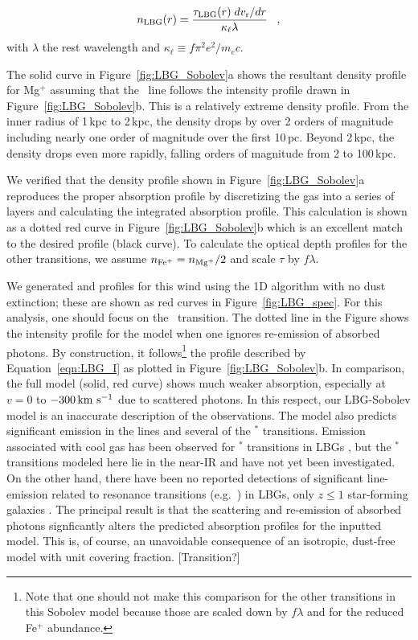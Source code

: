 \documentclass[12pt,preprint]{aastex}
\begin{document}
\begin{equation}
n_{\rm LBG}(r) = \frac{\tau_{\rm LBG}(r) \; dv_{\rm r}/dr}{\kappa_\ell
  \lambda} \;\;\; ,
\label{eqn:Sobolev}
\end{equation}
with $\lambda$ the rest wavelength and $\kappa_\ell \equiv f\pi^2
e^2/m_e c$.  

The solid curve in Figure~\ref{fig:LBG_Sobolev}a shows the
resultant density profile for Mg$^+$ assuming that the \mgiia\ line
follows the intensity profile drawn in Figure~\ref{fig:LBG_Sobolev}b. 
This is a relatively extreme density profile.  From the inner radius
of 1\,kpc to 2\,kpc, the density drops by over 2 orders of
magnitude including nearly one order of magnitude over the first
10\,pc.  Beyond 2\,kpc, the density drops even more rapidly, falling
orders of magnitude from 2 to 100\,kpc.

We verified that the density profile shown in
Figure~\ref{fig:LBG_Sobolev}a
reproduces the proper
absorption profile by discretizing the gas into a series of layers
and calculating the integrated absorption profile.  This
calculation is shown as a dotted red curve in
Figure~\ref{fig:LBG_Sobolev}b which is an excellent
match to the desired profile (black curve).
To calculate the optical depth profiles for the other transitions, we
assume $n_{\rm Fe^+} = n_{\rm Mg^+}/2$ and scale $\tau$ by $f\lambda$.

We generated  and  profiles for this wind
using the 1D algorithm with no dust extinction; these are shown as
red curves in Figure~\ref{fig:LBG_spec}.   For this analysis, one
should focus on the \mgiia\ transition.  The dotted line in the Figure
shows the intensity profile for the model when one ignores re-emission
of absorbed photons.  By construction, it follows\footnote{Note that
  one should not make this comparison for the other transitions in
  this Sobolev model because those are scaled down by $f\lambda$ and
  for  the reduced Fe$^+$ abundance.} the profile
described by Equation~\ref{eqn:LBG_I} as plotted in
Figure~\ref{fig:LBG_Sobolev}b.   In comparison, the full model (solid,
red curve)
shows much weaker absorption, especially at $v = 0$ to $-300 \, {\rm km~s^{-1}}$
due to scattered photons.
In this respect, our LBG-Sobolev model is an
inaccurate description of the observations. The model
also predicts significant emission in the  lines and several of
the $^*$ transitions.   Emission associated with cool gas
has been observed for $^*$
transitions in LBGs \citep{cb58,shapley}, but
the $^*$ transitions
modeled here lie in the near-IR and have not yet been investigated.
On the other hand, there have been no 
reported detections of significant line-emission related to resonance
transitions (e.g.\ ) in LBGs, only $z \le 1$ star-forming galaxies
\citep{wcp+09,rubin09}.  
The principal result is that the scattering and re-emission of
absorbed photons signficantly alters the predicted absorption profiles
for the inputted model.  This is, of course, an unavoidable
consequence of an isotropic, dust-free model with unit covering
fraction.
[Transition?]
\end{document}
